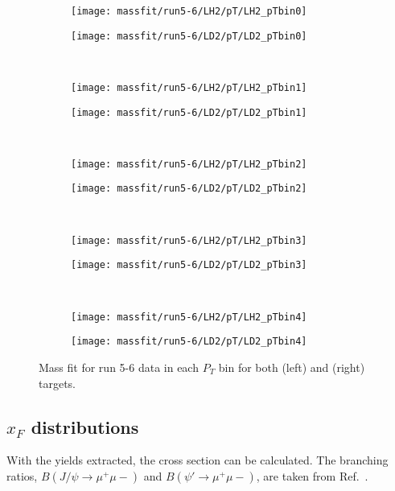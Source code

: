\documentclass[../main.tex]{subfiles}
\begin{document}
\begin{figure}[h]
	\centering
	\begin{subfigure}{0.4\linewidth}
		\texttt{[image: massfit/run5-6/LH2/pT/LH2\_pTbin0]}
	\end{subfigure}
	\begin{subfigure}{0.4\linewidth}
		\texttt{[image: massfit/run5-6/LD2/pT/LD2\_pTbin0]}
	\end{subfigure}\\
	\begin{subfigure}{0.4\linewidth}
		\texttt{[image: massfit/run5-6/LH2/pT/LH2\_pTbin1]}
	\end{subfigure}
	\begin{subfigure}{0.4\linewidth}
		\texttt{[image: massfit/run5-6/LD2/pT/LD2\_pTbin1]}
	\end{subfigure}\\
	\begin{subfigure}{0.4\linewidth}
		\texttt{[image: massfit/run5-6/LH2/pT/LH2\_pTbin2]}
	\end{subfigure}
	\begin{subfigure}{0.4\linewidth}
		\texttt{[image: massfit/run5-6/LD2/pT/LD2\_pTbin2]}
	\end{subfigure}\\
	\begin{subfigure}{0.4\linewidth}
		\texttt{[image: massfit/run5-6/LH2/pT/LH2\_pTbin3]}
	\end{subfigure}
	\begin{subfigure}{0.4\linewidth}
		\texttt{[image: massfit/run5-6/LD2/pT/LD2\_pTbin3]}
	\end{subfigure}\\
	\begin{subfigure}{0.4\linewidth}
		\texttt{[image: massfit/run5-6/LH2/pT/LH2\_pTbin4]}
	\end{subfigure}
	\begin{subfigure}{0.4\linewidth}
		\texttt{[image: massfit/run5-6/LD2/pT/LD2\_pTbin4]}
	\end{subfigure}
	\caption{Mass fit for run 5-6 data in each $P_T$ bin for both (left) and (right) targets. }
	\label{fig:massfit_5-6_pT}
\end{figure}

\FloatBarrier

\subsection{$x_F$ distributions}
With the yields extracted, the cross section can be calculated.
The branching ratios, $B\left(J/\psi\to\mu^+\mu-\right)$
and $B\left(\psi'\to\mu^+\mu-\right)$, are taken from Ref.~\cite{workman2022}.
\end{document}

